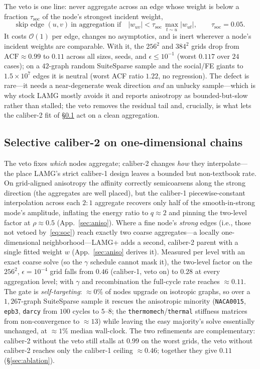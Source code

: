 \documentclass[review]{siamart220329}
\newcommand{\Oone}{\mathcal{O}(1)}
\newcommand{\acf}{\mathrm{ACF}}
\begin{document}
The veto is one line: never aggregate across an edge whose weight is below a fraction
$\tau_{\mathrm{soc}}$ of the node's strongest incident weight,
\begin{equation}\label{eq:soc}
\text{skip edge }(u,v)\ \text{in aggregation if}\quad |w_{uv}|<\tau_{\mathrm{soc}}\,\max_{t\sim u}|w_{ut}|,
\qquad \tau_{\mathrm{soc}}=0.05 .
\end{equation}
It costs $\Oone$ per edge, changes no asymptotics, and is inert wherever a node's incident
weights are comparable. With it, the $256^2$ and $384^2$ grids drop from $\acf\approx0.99$ to
$0.11$ across all sizes, seeds, and $\epsilon\le10^{-1}$ (worst $0.117$ over $24$ cases); on a
$42$-graph random SuiteSparse sample and the social/FE giants to $1.5\times10^7$ edges it is
neutral (worst ACF ratio $1.22$, no regression). The defect is rare---it needs a near-degenerate
weak direction \emph{and} an unlucky sample---which is why stock LAMG mostly avoids it and
reports anisotropy as bounded-but-slow rather than stalled; the veto removes the residual tail
and, crucially, is what lets the caliber-2 fit of \S\ref{sec:cal2} act on a clean aggregation.

\subsection{Selective caliber-2 on one-dimensional chains}\label{sec:cal2}
The veto fixes \emph{which} nodes aggregate; caliber-2 changes \emph{how} they
interpolate---the place LAMG's strict caliber-1 design leaves a bounded but non-textbook
rate. On grid-aligned anisotropy the affinity correctly semicoarsens along the strong direction
(the aggregates are well placed), but the caliber-1 piecewise-constant interpolation across each
$2{:}1$ aggregate recovers only half of the smooth-in-strong mode's amplitude, inflating the energy ratio to
$q\approx2$ and pinning the two-level factor at $\rho\approx0.5$ (App.~\ref{sec:aniso}). Where a
fine node's \emph{strong} edges (i.e., those not vetoed by~\eqref{eq:soc}) reach exactly two coarse aggregates---a locally one-dimensional
neighborhood---LAMG+ adds a second, caliber-2 parent with a single fitted weight $w$
(App.~\ref{sec:aniso} derives it). Measured per level with an exact coarse solve (so the
$\gamma$ schedule cannot mask it), the two-level factor on the $256^2$, $\epsilon=10^{-4}$ grid
falls from $0.46$ (caliber-1, veto on) to $0.28$ at every aggregation level; with $\gamma$ and
recombination the full-cycle rate reaches $\approx0.11$. The gate is \emph{self-targeting}:
$\approx\!0\%$ of nodes upgrade on isotropic graphs, so over a $1{,}267$-graph SuiteSparse
sample it rescues the anisotropic minority (\texttt{NACA0015}, \texttt{epb3}, \texttt{darcy}
from $100$ cycles to $5$--$8$; the \texttt{thermomech}/\texttt{thermal} stiffness matrices from
non-convergence to $\approx\!13$) while leaving the easy majority's solve essentially unchanged,
at $\approx\!1\%$ median wall-clock. The two refinements are complementary:
caliber-2 without the veto still stalls at $0.99$ on the worst grids, the veto without caliber-2
reaches only the caliber-1 ceiling $\approx0.46$; together they give $0.11$ (\S\ref{sec:ablation}).
\end{document}
